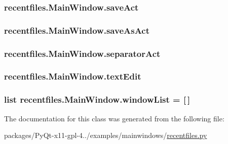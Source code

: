 \subsubsection[{save\+Act}]{\setlength{\rightskip}{0pt plus 5cm}recentfiles.\+Main\+Window.\+save\+Act}\label{classrecentfiles_1_1MainWindow_a1703de0780cdaf4e4f05e6e7c94993d2}
\hypertarget{classrecentfiles_1_1MainWindow_a3cb7e442ef9bd90f1a976472ea6e64a9}{}
\subsubsection[{save\+As\+Act}]{\setlength{\rightskip}{0pt plus 5cm}recentfiles.\+Main\+Window.\+save\+As\+Act}\label{classrecentfiles_1_1MainWindow_a3cb7e442ef9bd90f1a976472ea6e64a9}
\hypertarget{classrecentfiles_1_1MainWindow_ab646e6ac01beec5c7bc9c74dc5856e56}{}
\subsubsection[{separator\+Act}]{\setlength{\rightskip}{0pt plus 5cm}recentfiles.\+Main\+Window.\+separator\+Act}\label{classrecentfiles_1_1MainWindow_ab646e6ac01beec5c7bc9c74dc5856e56}
\hypertarget{classrecentfiles_1_1MainWindow_a55e00d8187ae6fa64e873bace7e349a3}{}
\subsubsection[{text\+Edit}]{\setlength{\rightskip}{0pt plus 5cm}recentfiles.\+Main\+Window.\+text\+Edit}\label{classrecentfiles_1_1MainWindow_a55e00d8187ae6fa64e873bace7e349a3}
\hypertarget{classrecentfiles_1_1MainWindow_af4bd124091ea9d91145d3bb73a0986da}{}
\subsubsection[{window\+List}]{\setlength{\rightskip}{0pt plus 5cm}list recentfiles.\+Main\+Window.\+window\+List = \mbox{[}$\,$\mbox{]}\hspace{0.3cm}{\ttfamily [static]}}\label{classrecentfiles_1_1MainWindow_af4bd124091ea9d91145d3bb73a0986da}


The documentation for this class was generated from the following file\+:\begin{DoxyCompactItemize}
\item 
packages/\+Py\+Qt-\/x11-\/gpl-\/4../examples/mainwindows/\hyperlink{recentfiles_8py}{recentfiles.\+py}\end{DoxyCompactItemize}
